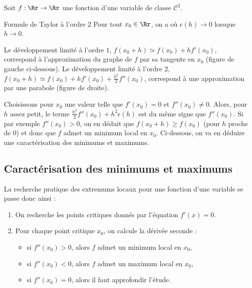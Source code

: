 Soit $f : \Rr \to \Rr$ une fonction d'une variable de classe $\mathcal{C}^2$. 
\begin{theoreme}{Formule de Taylor à l'ordre $2$}{} 
Pour tout $x_0 \in \Rr$, on a
où $\epsilon(h) \to 0$ lorsque $h\to0$.
\end{theoreme}

Le développement limité à l'ordre $1$, $f(x_0 + h) \simeq f(x_0) + hf'(x_0)$, correspond à l'approximation du graphe de $f$ par sa tangente en $x_0$ (figure de gauche ci-dessous).
Le développement limité à l'ordre $2$, $f(x_0 + h) \simeq f(x_0) + hf'(x_0) + \frac{h^2}{2} f''(x_0)$, correspond à une approximation par une parabole (figure de droite).




Choisissons pour $x_0$ une valeur telle que $f'(x_0)=0$ et $f''(x_0)\neq 0$. 
Alors, pour $h$ assez petit, le terme $ \frac{h^2}{2} f''(x_0) + h^2 \epsilon (h)$ est du même signe que $f''(x_0)$. Si par exemple $f''(x_0)>0$, on en déduit que $f(x_0 + h) \ge f(x_0)$ (pour $h$ proche de $0$) et donc que $f$ admet un minimum local en $x_0$.
Ci-dessous, on va en déduire une caractérisation des minimums et maximums.

\subsection{Caractérisation des minimums et maximums}

La recherche pratique des extremums locaux pour une fonction d'une variable se passe donc ainsi :
\begin{enumerate}
    \item On recherche les points critiques donnés par l'équation $f'(x) = 0$.
    \item Pour chaque point critique $x_0$, on calcule la dérivée seconde :
    \begin{itemize}
        \item si $f''(x_0) > 0$, alors $f$ admet un minimum local en $x_0$,   
        \item si $f''(x_0) < 0$, alors $f$ admet un maximum local en $x_0$,
        \item si $f''(x_0) = 0$, alors  il faut approfondir l'étude.
    \end{itemize}    
\end{enumerate}
    
